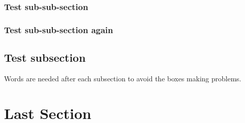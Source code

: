 \documentclass[a4paper,openany]{book}
\begin{document}
{\begin{multicols}{2}

  \lipsum[3]

  \elf

  \showStdSpells


  \subsubsection{Test sub-sub-section}

  \lipsum[10]

  \subsubsection{Test sub-sub-section again}

  \subsection{Test subsection}
  Words are needed after each subsection to avoid the boxes making problems.



  \lipsum[2]

  \elf

  \showStdSpells


  \lipsum[10]

  \section{Last Section}

  \lipsum[3]

  \end{multicols}

}




\end{document}

